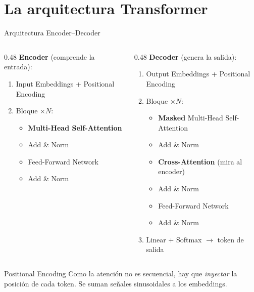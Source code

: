 \documentclass[aspectratio=169, 10pt]{beamer}
\newcommand{\concept}[1]{\textcolor{fenblue}{\textbf{#1}}}
\begin{document}
\section{La arquitectura Transformer}

\begin{frame}{Arquitectura Encoder--Decoder}

  \begin{columns}[T]
    \begin{column}{0.48\textwidth}
      \textbf{Encoder} (comprende la entrada):
      \begin{enumerate}
        \item Input Embeddings + Positional Encoding
        \item Bloque $\times N$:
          \begin{itemize}
            \item \concept{Multi-Head Self-Attention}
            \item Add \& Norm
            \item Feed-Forward Network
            \item Add \& Norm
          \end{itemize}
      \end{enumerate}
    \end{column}
    \begin{column}{0.48\textwidth}
      \textbf{Decoder} (genera la salida):
      \begin{enumerate}
        \item Output Embeddings + Positional Encoding
        \item Bloque $\times N$:
          \begin{itemize}
            \item \concept{Masked} Multi-Head Self-Attention
            \item Add \& Norm
            \item \concept{Cross-Attention} (mira al encoder)
            \item Add \& Norm
            \item Feed-Forward Network
            \item Add \& Norm
          \end{itemize}
        \item Linear + Softmax $\rightarrow$ token de salida
      \end{enumerate}
    \end{column}
  \end{columns}

  \vspace{0.5em}
  \begin{alertblock}{Positional Encoding}
    Como la atención no es secuencial, hay que \textit{inyectar} la posición de cada token. Se suman señales sinusoidales a los embeddings.
  \end{alertblock}

\end{frame}
\end{document}
